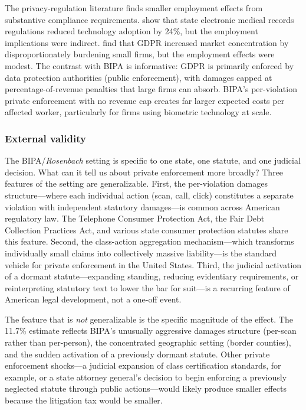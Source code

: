 \documentclass[12pt]{article}
\begin{document}
The privacy-regulation literature finds smaller employment effects from substantive compliance requirements. \citet{millertuck2009} show that state electronic medical records regulations reduced technology adoption by 24\%, but the employment implications were indirect. \citet{johnson2021} find that GDPR increased market concentration by disproportionately burdening small firms, but the employment effects were modest. The contrast with BIPA is informative: GDPR is primarily enforced by data protection authorities (public enforcement), with damages capped at percentage-of-revenue penalties that large firms can absorb. BIPA's per-violation private enforcement with no revenue cap creates far larger expected costs per affected worker, particularly for firms using biometric technology at scale.

\subsubsection*{External validity} The BIPA/\textit{Rosenbach} setting is specific to one state, one statute, and one judicial decision. What can it tell us about private enforcement more broadly? Three features of the setting are generalizable. First, the per-violation damages structure---where each individual action (scan, call, click) constitutes a separate violation with independent statutory damages---is common across American regulatory law. The Telephone Consumer Protection Act, the Fair Debt Collection Practices Act, and various state consumer protection statutes share this feature. Second, the class-action aggregation mechanism---which transforms individually small claims into collectively massive liability---is the standard vehicle for private enforcement in the United States. Third, the judicial activation of a dormant statute---expanding standing, reducing evidentiary requirements, or reinterpreting statutory text to lower the bar for suit---is a recurring feature of American legal development, not a one-off event.

The feature that is \textit{not} generalizable is the specific magnitude of the effect. The 11.7\% estimate reflects BIPA's unusually aggressive damages structure (per-scan rather than per-person), the concentrated geographic setting (border counties), and the sudden activation of a previously dormant statute. Other private enforcement shocks---a judicial expansion of class certification standards, for example, or a state attorney general's decision to begin enforcing a previously neglected statute through public actions---would likely produce smaller effects because the litigation tax would be smaller.
\end{document}
